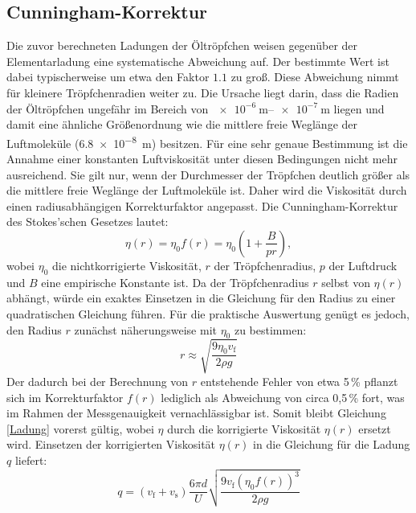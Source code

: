 \documentclass[12pt,a4paper,titlepage]{scrartcl}
\numberwithin{equation}{section}
\numberwithin{table}{section}
\numberwithin{figure}{section}
\begin{document}
\subsection{Cunningham-Korrektur}

Die zuvor berechneten Ladungen der Öltröpfchen weisen gegenüber der
Elementarladung eine systematische Abweichung auf. Der bestimmte Wert ist
dabei typischerweise um etwa den Faktor $1.1$ zu groß. Diese Abweichung
nimmt für kleinere Tröpfchenradien weiter zu.
\newline
Die Ursache liegt darin, dass die Radien der Öltröpfchen ungefähr im Bereich
von $\SIrange{e-6}{e-7}{\meter}$ liegen und damit eine ähnliche Größenordnung
wie die mittlere freie Weglänge der Luftmoleküle (\SI{6.8e-8}{\meter}) besitzen. 
Für eine sehr genaue Bestimmung ist die Annahme einer konstanten Luftviskosität unter diesen Bedingungen nicht mehr ausreichend.
Sie gilt nur, wenn der Durchmesser der Tröpfchen deutlich größer als die
mittlere freie Weglänge der Luftmoleküle ist.
\newline
Daher wird die Viskosität durch einen radiusabhängigen Korrekturfaktor
angepasst. Die Cunningham-Korrektur des Stokes'schen Gesetzes lautet:
\begin{equation}
    \eta(r) = \eta_0 f(r)
    = \eta_0\left(1+\frac{B}{pr}\right),
    \label{Cunningham}
\end{equation}
wobei $\eta_0$ die nichtkorrigierte Viskosität, $r$ der Tröpfchenradius,
$p$ der Luftdruck und $B$ eine empirische Konstante ist.\newline
Da der Tröpfchenradius $r$ selbst von $\eta(r)$ abhängt,
würde ein exaktes Einsetzen in die Gleichung für den Radius zu einer quadratischen Gleichung führen.
Für die praktische Auswertung genügt es jedoch, den Radius $r$ zunächst näherungsweise mit $\eta_0$ zu bestimmen:
\begin{equation}
    r \approx \sqrt{\frac{9\eta_0 v_{\text{f}}}{2\rho g}}
\end{equation}
Der dadurch bei der Berechnung von $r$ entstehende Fehler von etwa 5\,\% pflanzt sich im Korrekturfaktor $f(r)$ lediglich als Abweichung von circa 0,5\,\% fort,
was im Rahmen der Messgenauigkeit vernachlässigbar ist.
Somit bleibt Gleichung\,\eqref{Ladung} vorerst gültig, wobei $\eta$ durch die korrigierte Viskosität $\eta(r)$ ersetzt wird.
Einsetzen der korrigierten Viskosität $\eta(r)$ in die Gleichung für die Ladung $q$ liefert:
\begin{equation}
    q = (v_{\text{f}} + v_{\text{s}}) \frac{6\pi d}{U} \sqrt{\frac{9 v_{\text{f}} (\eta_\text{0}f(r))^3}{2\rho g}} \label{Ladung_korrigiert}
\end{equation}
\end{document}
